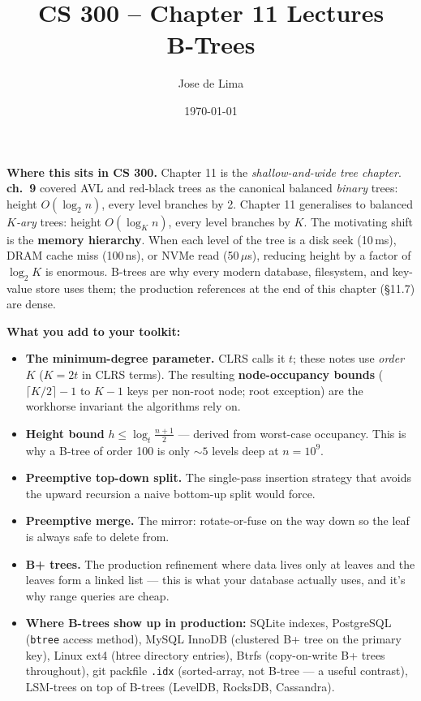 \documentclass[11pt]{article}
\title{CS 300 -- Chapter 11 Lectures\\\large B-Trees}
\author{Jose de Lima}
\date{\today}
\begin{document}
\maketitle

\begin{ideabox}
\textbf{Where this sits in CS 300.} Chapter 11 is the
\emph{shallow-and-wide tree chapter}. \textbf{ch.~9} covered AVL and
red-black trees as the canonical balanced \emph{binary} trees:
height $O(\log_2 n)$, every level branches by 2. Chapter 11
generalises to balanced \emph{$K$-ary} trees: height
$O(\log_K n)$, every level branches by $K$. The motivating shift
is the \textbf{memory hierarchy}. When each level of the tree is a
disk seek (10\,ms), DRAM cache miss (100\,ns), or NVMe read
(50\,$\mu$s), reducing height by a factor of $\log_2 K$ is enormous.
B-trees are why every modern database, filesystem, and key-value
store uses them; the production references at the end of this
chapter (\S11.7) are dense.

\textbf{What you add to your toolkit:}
\begin{itemize}
    \item \textbf{The minimum-degree parameter.} CLRS calls it $t$;
          these notes use \emph{order $K$} ($K = 2t$ in CLRS terms).
          The resulting \textbf{node-occupancy bounds}
          ($\lceil K/2 \rceil - 1$ to $K-1$ keys per non-root node;
          root exception) are the workhorse invariant the algorithms
          rely on.
    \item \textbf{Height bound} $h \le \log_t \frac{n+1}{2}$ ---
          derived from worst-case occupancy. This is why a B-tree of
          order 100 is only $\sim 5$ levels deep at $n = 10^9$.
    \item \textbf{Preemptive top-down split.} The single-pass
          insertion strategy that avoids the upward recursion a
          naive bottom-up split would force.
    \item \textbf{Preemptive merge.} The mirror: rotate-or-fuse on
          the way down so the leaf is always safe to delete from.
    \item \textbf{B+ trees.} The production refinement where data
          lives only at leaves and the leaves form a linked list ---
          this is what your database actually uses, and it's why
          range queries are cheap.
    \item \textbf{Where B-trees show up in production:} SQLite
          indexes, PostgreSQL (\texttt{btree} access method), MySQL
          InnoDB (clustered B+ tree on the primary key), Linux ext4
          (htree directory entries), Btrfs (copy-on-write B+ trees
          throughout), git packfile \texttt{.idx} (sorted-array, not
          B-tree --- a useful contrast), LSM-trees on top of B-trees
          (LevelDB, RocksDB, Cassandra).
\end{itemize}


\end{ideabox}
\end{document}
